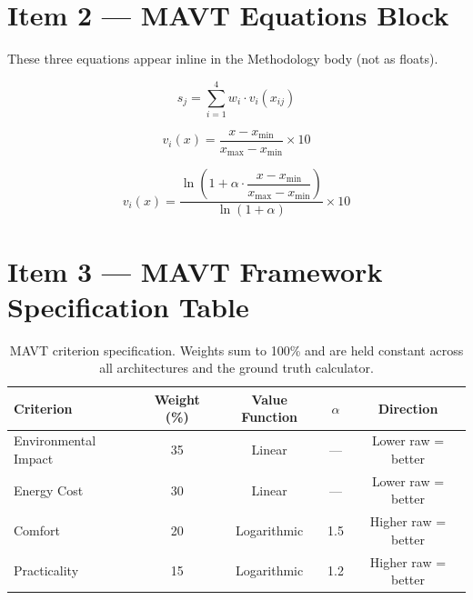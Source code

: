 \documentclass[a4paper,11pt]{article}
\begin{document}
\section*{Item 2 — MAVT Equations Block}

\noindent These three equations appear inline in the Methodology body (not as floats).

\begin{equation}
  \label{eq:mavt_sum}
  s_j = \sum_{i=1}^{4} w_i \cdot v_i(x_{ij})
\end{equation}

\begin{equation}
  \label{eq:linear_vf}
  v_i(x) = \frac{x - x_{\min}}{x_{\max} - x_{\min}} \times 10
\end{equation}

\begin{equation}
  \label{eq:log_vf}
  v_i(x) = \frac{\ln\!\left(1 + \alpha \cdot
  \dfrac{x - x_{\min}}{x_{\max} - x_{\min}}\right)}
  {\ln(1 + \alpha)} \times 10
\end{equation}


\section*{Item 3 — MAVT Framework Specification Table}

\begin{table}[t]
  \centering
  \small
  \caption{MAVT criterion specification. Weights sum to 100\% and are held
    constant across all architectures and the ground truth calculator.}
  \label{tab:item3}
  \begin{tabular}{@{}lcccc@{}}
    \toprule
    Criterion            & Weight (\%) & Value Function & $\alpha$ & Direction \\
    \midrule
    Environmental Impact & 35          & Linear         & ---      & Lower raw = better \\
    Energy Cost          & 30          & Linear         & ---      & Lower raw = better \\
    Comfort              & 20          & Logarithmic    & 1.5      & Higher raw = better \\
    Practicality         & 15          & Logarithmic    & 1.2      & Higher raw = better \\
    \bottomrule
  \end{tabular}
\end{table}
\end{document}
